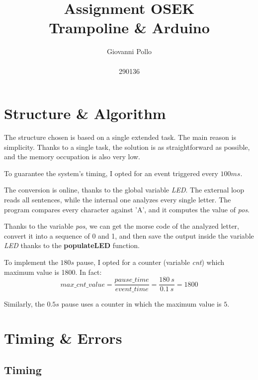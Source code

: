 \documentclass[a4paper]{article}
\title{\Huge Assignment OSEK \\ \LARGE Trampoline \& Arduino}
\author{\huge Giovanni Pollo \\ \\ \huge 290136}
\date{}
\begin{document}
\begin{titlepage}
  \centering
  \vspace{2px}
\end{titlepage}
\maketitle




\newpage


\section{Structure \& Algorithm}
The structure chosen is based on a single extended task. The main reason is simplicity. Thanks to a single task, the solution is as straightforward as possible, and the memory occupation is also very low.

To guarantee the system's timing, I opted for an event triggered every \(100ms\).

The conversion is online, thanks to the global variable \emph{LED}. The external loop reads all sentences, while the internal one analyzes every single letter. The program compares every character against 'A', and it computes the value of \emph{pos}.

Thanks to the variable \emph{pos}, we can get the morse code of the analyzed letter, convert it into a sequence of 0 and 1, and then save the output inside the variable \emph{LED} thanks to the \textbf{populateLED} function.

To implement the \(180s\) pause, I opted for a counter (variable \emph{cnt}) which maximum value is 1800. In fact:
\begin{equation}
  max\_cnt\_value = \frac{pause\_time}{event\_time} = \frac{180\ s}{0.1\ s} = 1800
\end{equation}

Similarly, the \(0.5s\) pause uses a counter in which the maximum value is \(5\).

\section{Timing \& Errors}
\subsection{Timing} \label{Timing}
\end{document}
